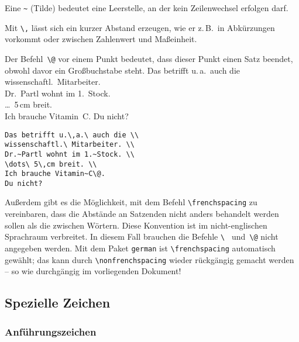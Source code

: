 Eine \verb|~| (Tilde) bedeutet eine Leerstelle,
an der kein Zeilenwechsel erfolgen darf.

Mit \verb|\,| lässt sich ein kurzer Abstand erzeugen, wie er
z.\,B.\ in Abkürzungen vorkommt oder zwischen Zahlenwert und Maßeinheit.

Der Befehl~\verb|\@| vor einem Punkt bedeutet, dass dieser Punkt
einen Satz beendet, obwohl davor ein Großbuchstabe steht.
\exa
Das betrifft u.\,a.\ auch die \\
wissenschaftl.\ Mitarbeiter. \\
Dr.~Partl wohnt im 1.~Stock. \\
\dots\ 5\,cm breit. \\
Ich brauche Vitamin~C\@. Du nicht?
\exb
\begin{verbatim}
Das betrifft u.\,a.\ auch die \\
wissenschaftl.\ Mitarbeiter. \\
Dr.~Partl wohnt im 1.~Stock. \\
\dots\ 5\,cm breit. \\
Ich brauche Vitamin~C\@.
Du nicht?
\end{verbatim}
\exc
 
Außerdem gibt es die Möglichkeit, mit dem Befehl
\verb|\frenchspacing|
zu vereinbaren, dass die Abstände an Satzenden nicht anders
behandelt werden sollen als die zwischen Wörtern.
Diese Konvention ist im nicht-englischen Sprachraum verbreitet.
In diesem Fall brauchen die Befehle \verb|\ | und~\verb|\@| nicht
angegeben werden.
Mit dem Paket \texttt{german} ist \verb:\frenchspacing:
automatisch gewählt; das kann durch
\verb:\nonfrenchspacing:
wieder rückgängig gemacht werden -- so wie durchgängig im vorliegenden
Dokument!

 

\subsection{Spezielle Zeichen} \label{spezial}
 
\subsubsection{Anführungszeichen} \label{quotes}
 
